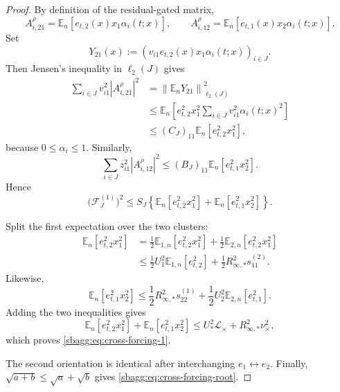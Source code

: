 \documentclass{article} %
\theoremstyle{plain}
\theoremstyle{definition}
\theoremstyle{remark}
\begin{document}
\begin{proof}
By definition of the residual-gated matrix,
\[
A_{i,21}^\rho
=
\mathbb E_n[e_{t,2}(x)x_1\alpha_i(t;x)],
\qquad
A_{i,12}^\rho
=
\mathbb E_n[e_{t,1}(x)x_2\alpha_i(t;x)].
\]
Set
\[
Y_{21}(x)
:=
\left(
v_{i1}e_{t,2}(x)x_1\alpha_i(t;x)
\right)_{i\in J}.
\]
Then Jensen's inequality in $\ell_2(J)$ gives
\[
\begin{aligned}
\sum_{i\in J}
v_{i1}^2|A_{i,21}^\rho|^2
&=
\left\|
\mathbb E_nY_{21}
\right\|_{\ell_2(J)}^2
\\
&\le
\mathbb E_n
\left[
e_{t,2}^2x_1^2
\sum_{i\in J}
v_{i1}^2\alpha_i(t;x)^2
\right]
\\
&\le
(C_J)_{11}
\mathbb E_n[e_{t,2}^2x_1^2],
\end{aligned}
\]
because $0\le\alpha_i\le1$.  Similarly,
\[
\sum_{i\in J}
z_{i1}^2|A_{i,12}^\rho|^2
\le
(B_J)_{11}
\mathbb E_n[e_{t,1}^2x_2^2].
\]
Hence
\[
\bigl(\mathcal F_J^{(1)}\bigr)^2
\le
S_J
\left\{
\mathbb E_n[e_{t,2}^2x_1^2]
+
\mathbb E_n[e_{t,1}^2x_2^2]
\right\}.
\]

Split the first expectation over the two clusters:
\[
\begin{aligned}
\mathbb E_n[e_{t,2}^2x_1^2]
&=
\frac12
\mathbb E_{1,n}[e_{t,2}^2x_1^2]
+
\frac12
\mathbb E_{2,n}[e_{t,2}^2x_1^2]
\\
&\le
\frac12
U_1^2\mathbb E_{1,n}[e_{t,2}^2]
+
\frac12
R_{\infty,*}^2s_{11}^{(2)}.
\end{aligned}
\]
Likewise,
\[
\mathbb E_n[e_{t,1}^2x_2^2]
\le
\frac12
R_{\infty,*}^2s_{22}^{(1)}
+
\frac12
U_2^2\mathbb E_{2,n}[e_{t,1}^2].
\]
Adding the two inequalities gives
\[
\mathbb E_n[e_{t,2}^2x_1^2]
+
\mathbb E_n[e_{t,1}^2x_2^2]
\le
U_*^2\mathcal L_\times
+
R_{\infty,*}^2\nu_\times^2,
\]
which proves \eqref{sbagg:eq:cross-forcing-1}.

The second orientation is identical after interchanging
$e_1\leftrightarrow e_2$.  Finally,
$\sqrt{a+b}\le\sqrt a+\sqrt b$ gives
\eqref{sbagg:eq:cross-forcing-root}.
\end{proof}
\end{document}
